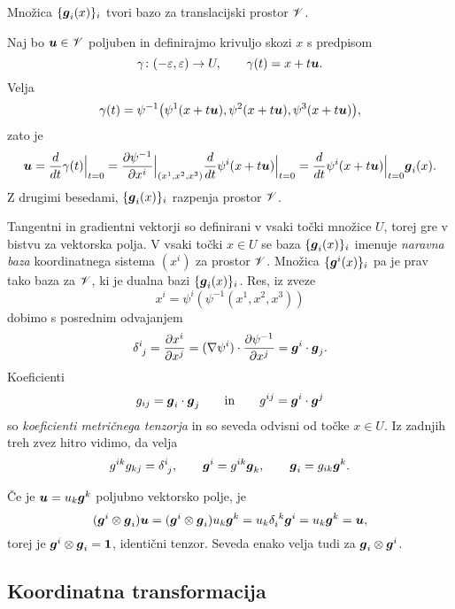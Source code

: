 \begin{trditev}
	Množica $\{\boldsymbol g_i(x)\}_i$ tvori bazo za translacijski prostor $\mathscr V$.
\end{trditev}

\proof
	Naj bo $\boldsymbol u\in\mathscr V$ poljuben in definirajmo krivuljo skozi $x$ s predpisom
	\[ \gamma\colon(-\varepsilon,\varepsilon)\to U,\qquad \gamma(t)=x+t\boldsymbol u. \]
	Velja
	\[ \gamma(t)=\psi^{-1}\big(\psi^1(x+t\boldsymbol u),\psi^2(x+t\boldsymbol u),\psi^3(x+t\boldsymbol u)\big), \]
	zato je
	\[
		\boldsymbol u=\frac{d}{dt}\gamma(t)\Big|_{t=0}=
		\frac{\partial\psi^{-1}}{\partial x^i}\Big|_{(x^1,x^2,x^3)}
		\frac{d}{dt}\psi^i(x+t\boldsymbol u)\Big|_{t=0}=
		\frac{d}{dt}\psi^i(x+t\boldsymbol u)\Big|_{t=0}\boldsymbol g_i(x).
	\]
	Z drugimi besedami, $\{\boldsymbol g_i(x)\}_{i}$ razpenja prostor $\mathscr V$.
\endproof

Tangentni in gradientni vektorji so definirani v vsaki točki množice $U$, torej
gre v bistvu za vektorska polja. V vsaki točki $x\in U$ se baza $\{\boldsymbol g_i(x)\}_i$
imenuje \emph{naravna baza} koordinatnega sistema $(x^i)$ za prostor $\mathscr V$.
Množica $\{\boldsymbol g^i(x)\}_i$ pa je prav tako baza za $\mathscr V$, ki je dualna bazi $\{\boldsymbol g_i(x)\}_i$.
Res, iz zveze
\[ x^i=\psi^i(\psi^{-1}(x^1,x^2,x^3)) \]
dobimo s posrednim odvajanjem
\begin{equation} \label{e:gigj}
	\topbot{\delta}{i}{j}=\frac{\partial x^i}{\partial x^j}=
	(\nabla\psi^i)\cdot\frac{\partial\psi^{-1}}{\partial x^j}=\vek{g}^i\cdot\vek{g}_j.
\end{equation}
Koeficienti
\[ g_{ij}=\boldsymbol g_i\cdot\boldsymbol g_j\qquad\textrm{in}\qquad g^{ij}=\boldsymbol g^i\cdot\boldsymbol g^j \]
so \emph{koeficienti metričnega tenzorja} in so seveda odvisni od točke $x\in U$. 
Iz zadnjih treh zvez hitro vidimo, da velja
\begin{equation} \label{e:relzag}
	g^{ik}g_{kj}=\topbot{\delta}{i}{j},\qquad \vek{g}^i=g^{ik}\vek{g}_k,\qquad \vek{g}_i=g_{ik}\vek{g}^k.
\end{equation}

Če je $\boldsymbol u=u_k\boldsymbol g^k$ poljubno vektorsko polje, je
\begin{equation} \label{e:iten}
	(\vek{g}^i\otimes\vek{g}_i)\vek{u}=(\vek{g}^i\otimes\vek{g}_i)u_k\vek{g}^k=
	u_k\bottop{\delta}{i}{k}\vek{g}^i=u_k\vek{g}^k=\vek{u},
\end{equation}
torej je $\boldsymbol g^i\otimes\boldsymbol g_i=\mathbf 1$, identični tenzor. Seveda enako velja
tudi za $\boldsymbol g_i\otimes\boldsymbol g^i$.


\subsection{Koordinatna transformacija}


